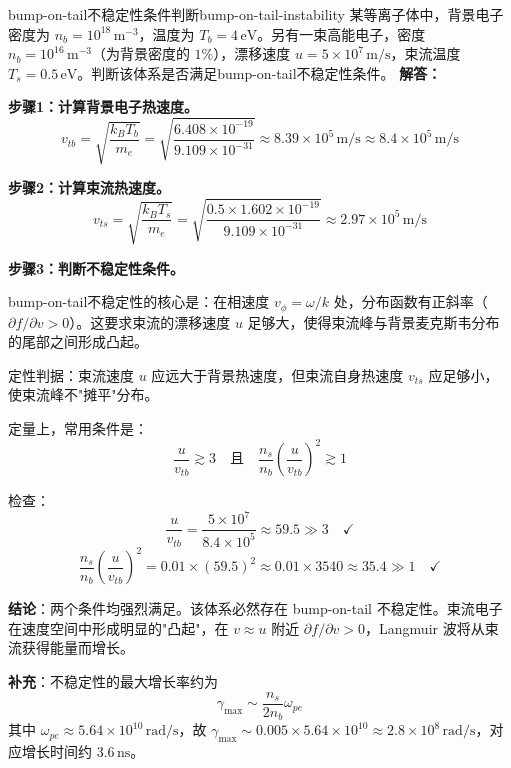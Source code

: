 \begin{example}{bump-on-tail不稳定性条件判断}{bump-on-tail-instability}
某等离子体中，背景电子密度为 $n_b = 10^{18}\,\mathrm{m}^{-3}$，温度为 $T_b = 4\,\mathrm{eV}$。另有一束高能电子，密度 $n_b = 10^{16}\,\mathrm{m}^{-3}$（为背景密度的 $1\%$），漂移速度 $u = 5\times 10^{7}\,\mathrm{m/s}$，束流温度 $T_s = 0.5\,\mathrm{eV}$。判断该体系是否满足bump-on-tail不稳定性条件。
\tcblower
\textbf{解答：}

\textbf{步骤1：计算背景电子热速度。}
\[
v_{tb} = \sqrt{\frac{k_{\!B}T_b}{m_e}}
= \sqrt{\frac{6.408\times 10^{-19}}{9.109\times 10^{-31}}}
\approx 8.39\times 10^{5}\,\mathrm{m/s} \approx 8.4\times 10^{5}\,\mathrm{m/s}
\]

\textbf{步骤2：计算束流热速度。}
\[
v_{ts} = \sqrt{\frac{k_{\!B}T_s}{m_e}}
= \sqrt{\frac{0.5\times 1.602\times 10^{-19}}{9.109\times 10^{-31}}}
\approx 2.97\times 10^{5}\,\mathrm{m/s}
\]

\textbf{步骤3：判断不稳定性条件。}

bump-on-tail不稳定性的核心是：在相速度 $v_\phi = \omega/k$ 处，分布函数有正斜率（$\partial f/\partial v > 0$）。这要求束流的漂移速度 $u$ 足够大，使得束流峰与背景麦克斯韦分布的尾部之间形成凸起。

定性判据：束流速度 $u$ 应远大于背景热速度，但束流自身热速度 $v_{ts}$ 应足够小，使束流峰不"摊平"分布。

定量上，常用条件是：
\[
\frac{u}{v_{tb}} \gtrsim 3\quad\text{且}\quad
\frac{n_s}{n_b}\left(\frac{u}{v_{tb}}\right)^2 \gtrsim 1
\]

检查：
\[
\frac{u}{v_{tb}} = \frac{5\times 10^{7}}{8.4\times 10^{5}} \approx 59.5 \gg 3 \quad\checkmark
\]
\[
\frac{n_s}{n_b}\left(\frac{u}{v_{tb}}\right)^2
= 0.01\times (59.5)^2 \approx 0.01\times 3540 \approx 35.4 \gg 1 \quad\checkmark
\]

\textbf{结论}：两个条件均强烈满足。该体系必然存在 bump-on-tail 不稳定性。束流电子在速度空间中形成明显的"凸起"，在 $v \approx u$ 附近 $\partial f/\partial v > 0$，Langmuir 波将从束流获得能量而增长。

\textbf{补充}：不稳定性的最大增长率约为
\[
\gamma_{\max} \sim \frac{n_s}{2n_b}\omega_{pe}
\]
其中 $\omega_{pe} \approx 5.64\times 10^{10}\,\mathrm{rad/s}$，故 $\gamma_{\max} \sim 0.005\times 5.64\times 10^{10} \approx 2.8\times 10^{8}\,\mathrm{rad/s}$，对应增长时间约 $3.6\,\mathrm{ns}$。
\end{example}

